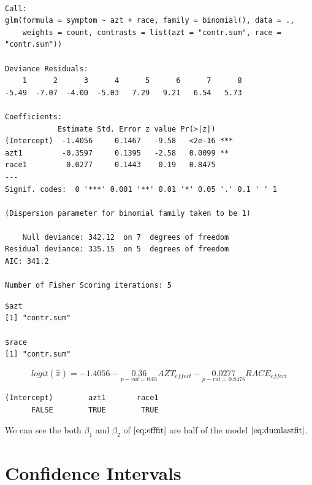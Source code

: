 \documentclass[]{book}
\newenvironment{Shaded}{\begin{snugshade}}{\end{snugshade}}
\newcommand{\NormalTok}[1]{#1}
\newcommand{\OperatorTok}[1]{\textcolor[rgb]{0.81,0.36,0.00}{\textbf{#1}}}
\begin{document}
\begin{verbatim}

Call:
glm(formula = symptom ~ azt + race, family = binomial(), data = ., 
    weights = count, contrasts = list(azt = "contr.sum", race = "contr.sum"))

Deviance Residuals: 
    1      2      3      4      5      6      7      8  
-5.49  -7.07  -4.00  -5.03   7.29   9.21   6.54   5.73  

Coefficients:
            Estimate Std. Error z value Pr(>|z|)    
(Intercept)  -1.4056     0.1467   -9.58   <2e-16 ***
azt1         -0.3597     0.1395   -2.58   0.0099 ** 
race1         0.0277     0.1443    0.19   0.8475    
---
Signif. codes:  0 '***' 0.001 '**' 0.01 '*' 0.05 '.' 0.1 ' ' 1

(Dispersion parameter for binomial family taken to be 1)

    Null deviance: 342.12  on 7  degrees of freedom
Residual deviance: 335.15  on 5  degrees of freedom
AIC: 341.2

Number of Fisher Scoring iterations: 5
\end{verbatim}

\begin{Shaded}
\end{Shaded}

\begin{verbatim}
$azt
[1] "contr.sum"

$race
[1] "contr.sum"
\end{verbatim}

\begin{equation}
logit(\hat\pi) = -1.4056 - \underset{p-val = 0.01}{0.36} AZT_{effect} - \underset{p-val = 0.8476}{0.0277} RACE_{effect}
\label{eq:efffit}
\end{equation}

\begin{verbatim}
(Intercept)        azt1       race1 
      FALSE        TRUE        TRUE 
\end{verbatim}

We can see the both \(\beta_1\) and \(\beta_2\) of \(\eqref{eq:efffit}\) are half of the model \(\eqref{eq:dumlastfit}\).

\hypertarget{confidence-intervals}{%
\section{Confidence Intervals}\label{confidence-intervals}}
\end{document}
